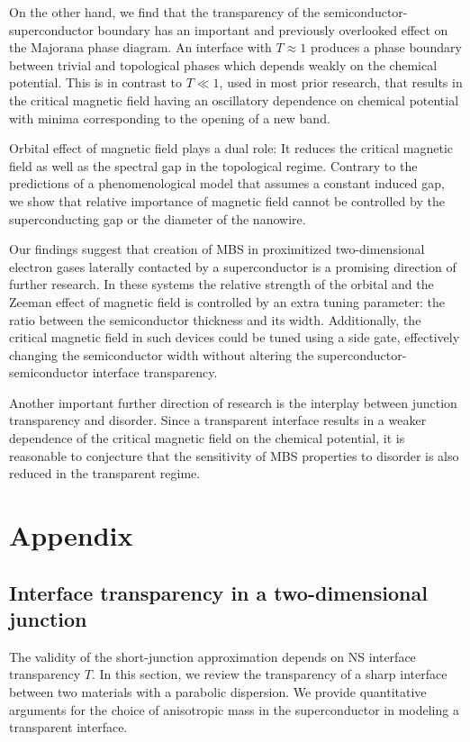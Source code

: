 On the other hand, we find that the transparency of the semiconductor-superconductor boundary has an important and previously overlooked effect on the Majorana phase diagram.
An interface with $T \approx 1$ produces a phase boundary between trivial and topological phases which depends weakly on the chemical potential.
This is in contrast to $T \ll 1$, used in most prior research, that results in the critical magnetic field having an oscillatory dependence on chemical potential with minima corresponding to the opening of a new band.

Orbital effect of magnetic field plays a dual role: It reduces the critical magnetic field as well as the spectral gap in the topological regime.
Contrary to the predictions of a phenomenological model that assumes a constant induced gap, we show that relative importance of magnetic field cannot be controlled by the superconducting gap or the diameter of the nanowire.

Our findings suggest that creation of MBS in proximitized two-dimensional electron gases laterally contacted by a superconductor is a promising direction of further research.
In these systems the relative strength of the orbital and the Zeeman effect of magnetic field is controlled by an extra tuning parameter: the ratio between the semiconductor thickness and its width.
Additionally, the critical magnetic field in such devices could be tuned using a side gate, effectively changing the semiconductor width without altering the superconductor-semiconductor interface transparency.

Another important further direction of research is the interplay between junction transparency and disorder.
Since a transparent interface results in a weaker dependence of the critical magnetic field on the chemical potential, it is reasonable to conjecture that the sensitivity of MBS properties to disorder is also reduced in the transparent regime.

\section{Appendix} \label{sec:app}

\subsection{Interface transparency in a two-dimensional junction}
The validity of the short-junction approximation depends on NS interface transparency $T$.
In this section, we review the transparency of a sharp interface between two materials with a parabolic dispersion.
We provide quantitative arguments for the choice of anisotropic mass in the superconductor in modeling a transparent interface.

